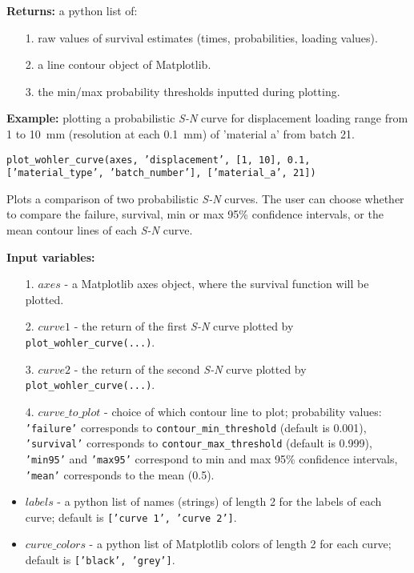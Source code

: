 \documentclass[twoside,a4paper]{refart}
\begin{document}
\textbf{Returns:} a python list of:
\begin{itemize}
    \item[1.] raw values of survival estimates (times, probabilities, loading values).
    \item[2.] a line contour object of Matplotlib.
    \item[3.] the min/max probability thresholds inputted during plotting.
\end{itemize}

\textbf{Example:} plotting a probabilistic \textit{S-N} curve for displacement loading range from 1 to 10~mm (resolution at each 0.1~mm) of 'material a' from batch 21.

\texttt{plot\_wohler\_curve(axes, 'displacement', [1, 10], 0.1,} \\
\texttt{['material\_type', 'batch\_number'], ['material\_a', 21])}


Plots a comparison of two probabilistic \textit{S-N} curves. The user can choose whether to compare the failure, survival, min or max 95\% confidence intervals, or the mean contour lines of each \textit{S-N} curve.

\textbf{Input variables:}
\begin{itemize}
    \item[1.] $axes$ - a Matplotlib axes object, where the survival function will be plotted.
    \item[2.] $curve1$ - the return of the first \textit{S-N} curve plotted by \texttt{plot\_wohler\_curve(...)}.
    \item[3.] $curve2$ - the return of the second \textit{S-N} curve plotted by \texttt{plot\_wohler\_curve(...)}.
    \item[4.] $curve\_to\_plot$ - choice of which contour line to plot; probability values: \texttt{'failure'} corresponds to \texttt{contour\_min\_threshold} (default is 0.001), \texttt{'survival'} corresponds to \texttt{contour\_max\_threshold} (default is 0.999), \texttt{'min95'} and \texttt{'max95'} correspond to min and max 95\% confidence intervals, \texttt{'mean'} corresponds to the mean (0.5). 
    \item $labels$ - a python list of names (strings) of length 2 for the labels of each curve; default is  \texttt{['curve 1', 'curve 2']}.
    \item $curve\_colors$ - a python list of Matplotlib colors of length 2 for each curve; default is \texttt{['black', 'grey']}.
\end{itemize}
\end{document}
